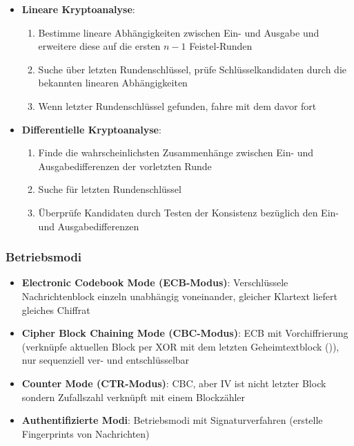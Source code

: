 \begin{itemize}
	\item \textbf{Lineare Kryptoanalyse}:
	\begin{enumerate}
		\item Bestimme lineare Abhängigkeiten zwischen Ein- und Ausgabe und erweitere diese auf die ersten $n - 1$ Feistel-Runden
		\item Suche über letzten Rundenschlüssel, prüfe Schlüsselkandidaten durch die bekannten linearen Abhängigkeiten
		\item Wenn letzter Rundenschlüssel gefunden, fahre mit dem davor fort
	\end{enumerate}
	\item \textbf{Differentielle Kryptoanalyse}:
	\begin{enumerate}
		\item Finde die wahrscheinlichsten Zusammenhänge zwischen Ein- und Ausgabedifferenzen der vorletzten Runde
		\item Suche für letzten Rundenschlüssel
		\item Überprüfe Kandidaten durch Testen der Konsistenz bezüglich den Ein- und Ausgabedifferenzen
	\end{enumerate}
\end{itemize}
	
\subsubsection{Betriebsmodi}%
\label{symver:ssub:betriebsmodi}

\begin{itemize}
	\item \textbf{Electronic Codebook Mode (ECB-Modus)}: Verschlüssele Nachrichtenblock einzeln unabhängig voneinander, gleicher Klartext liefert gleiches Chiffrat
	\item \textbf{Cipher Block Chaining Mode (CBC-Modus)}: ECB mit Vorchiffrierung (verknüpfe aktuellen Block per XOR mit dem letzten Geheimtextblock ()), nur sequenziell ver- und entschlüsselbar
	\item \textbf{Counter Mode (CTR-Modus)}: CBC, aber IV ist nicht letzter Block sondern Zufallszahl verknüpft mit einem Blockzähler
	\item \textbf{Authentifizierte Modi}: Betriebsmodi mit Signaturverfahren (erstelle Fingerprints von Nachrichten)
\end{itemize}
